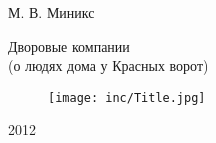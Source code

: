 \documentclass[utf8x, 12pt]{G7-32} %
\begin{document}
\frontmatter %



\thispagestyle{empty} 

\begin{center}
М. В. Миникс

\vfill

\large Дворовые компании \\(о людях дома у Красных ворот)

\vfill

\begin{figure}[ht]
  \centering
  \texttt{[image: inc/Title.jpg]}
\end{figure}

\vfill

2012

\end{center}

\mainmatter %



\backmatter %



\appendix   %
\end{document}
